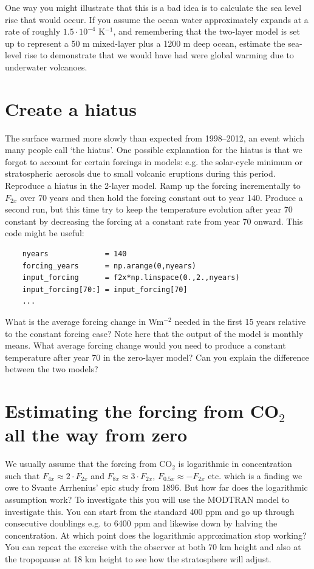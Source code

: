 \documentclass[12pt]{book}
\begin{document}
One way you might illustrate that this is a bad idea is to calculate the sea level rise that would occur. If you assume the ocean water approximately expands at a rate of roughly $1.5\cdot 10^{-4}$ K$^{-1}$, and remembering that the two-layer model is set up to represent a 50 m mixed-layer plus a 1200 m deep ocean, estimate the sea-level rise to demonstrate that we would have had were global warming due to underwater volcanoes.


\section{Create a hiatus}
The surface warmed more slowly than expected from 1998--2012, an event which many people call `the hiatus'. One possible explanation for the hiatus is that we forgot to account for certain forcings in models: e.g. the solar-cycle minimum or stratospheric aerosols due to small volcanic eruptions during this period. Reproduce a hiatus in the 2-layer model. Ramp up the forcing incrementally to $F_{2x}$ over 70 years and then hold the forcing constant out to year 140. Produce a second run, but this time try to keep the temperature evolution after year 70 constant by decreasing the forcing at a constant rate from year 70 onward.  This code might be useful:
\begin{verbatim}
    nyears             = 140
    forcing_years      = np.arange(0,nyears)
    input_forcing      = f2x*np.linspace(0.,2.,nyears)
    input_forcing[70:] = input_forcing[70]
    ...
\end{verbatim}
What is the average forcing change in Wm$^{-2}$ needed in the first 15 years relative to the constant forcing case? Note here that the output of the model is monthly means. What average forcing change would you need to produce a constant temperature after year 70 in the zero-layer model? Can you explain the difference between the two models? %


\section{Estimating the forcing from CO$_2$ all the way from zero}
We usually assume that the forcing from CO$_2$ is logarithmic in concentration such that $F_{4x} \approx 2\cdot F_{2x}$ and $F_{8x} \approx 3\cdot F_{2x}$, $F_{0.5x} \approx -F_{2x}$ etc. which is a finding we owe to Svante Arrhenius' epic study from 1896. But how far does the logarithmic assumption work? To investigate this you will use the MODTRAN model to investigate this. You can start from the standard 400 ppm and go up through consecutive doublings e.g. to 6400 ppm and likewise down by halving the concentration. At which point does the logarithmic approximation stop working? You can repeat the exercise with the observer at both 70 km height and also at the tropopause at 18 km height to see how the stratosphere will adjust. 
\end{document}
